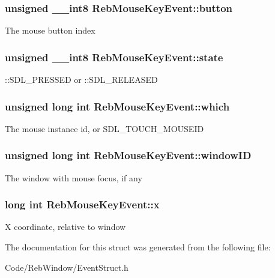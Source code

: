 \subsubsection[{\texorpdfstring{button}{button}}]{\setlength{\rightskip}{0pt plus 5cm}unsigned \+\_\+\+\_\+int8 Reb\+Mouse\+Key\+Event\+::button}\hypertarget{struct_reb_mouse_key_event_a11847818d7d2a32d7ab75912a09c0775}{}\label{struct_reb_mouse_key_event_a11847818d7d2a32d7ab75912a09c0775}
The mouse button index 
\subsubsection[{\texorpdfstring{state}{state}}]{\setlength{\rightskip}{0pt plus 5cm}unsigned \+\_\+\+\_\+int8 Reb\+Mouse\+Key\+Event\+::state}\hypertarget{struct_reb_mouse_key_event_a59cb4348c4a76b805bd2febab9cb80ae}{}\label{struct_reb_mouse_key_event_a59cb4348c4a76b805bd2febab9cb80ae}
\+::\+S\+D\+L\+\_\+\+P\+R\+E\+S\+S\+ED or \+::\+S\+D\+L\+\_\+\+R\+E\+L\+E\+A\+S\+ED 
\subsubsection[{\texorpdfstring{which}{which}}]{\setlength{\rightskip}{0pt plus 5cm}unsigned long int Reb\+Mouse\+Key\+Event\+::which}\hypertarget{struct_reb_mouse_key_event_a77af8b913a00cdba24d154c3054619a5}{}\label{struct_reb_mouse_key_event_a77af8b913a00cdba24d154c3054619a5}
The mouse instance id, or S\+D\+L\+\_\+\+T\+O\+U\+C\+H\+\_\+\+M\+O\+U\+S\+E\+ID 
\subsubsection[{\texorpdfstring{window\+ID}{windowID}}]{\setlength{\rightskip}{0pt plus 5cm}unsigned long int Reb\+Mouse\+Key\+Event\+::window\+ID}\hypertarget{struct_reb_mouse_key_event_a7f0b015a25849ac48c0561f24e11e1e1}{}\label{struct_reb_mouse_key_event_a7f0b015a25849ac48c0561f24e11e1e1}
The window with mouse focus, if any 
\subsubsection[{\texorpdfstring{x}{x}}]{\setlength{\rightskip}{0pt plus 5cm}long int Reb\+Mouse\+Key\+Event\+::x}\hypertarget{struct_reb_mouse_key_event_a7cb986f6394a03e391c3430864165528}{}\label{struct_reb_mouse_key_event_a7cb986f6394a03e391c3430864165528}
X coordinate, relative to window 

The documentation for this struct was generated from the following file\+:\begin{DoxyCompactItemize}
\item 
Code/\+Reb\+Window/Event\+Struct.\+h\end{DoxyCompactItemize}

